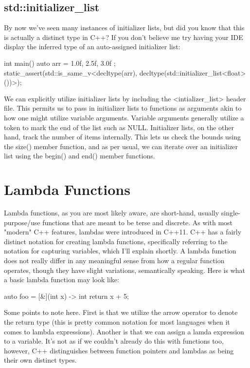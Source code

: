 \documentclass{article}
\begin{document}
\subsection{std::initializer\_list}

By now we've seen many instances of initializer lists, but did you know that this is actually a distinct type
in C++? If you don't believe me try having your IDE display the inferred type of an auto-assigned initializer
list:

\begin{cpplst}
    int main()
    {
        auto arr = { 1.0f, 2.5f, 3.0f };
        static_assert(std::is_same_v<decltype(arr), decltype(std::initializer_list<float>())>);
    }
\end{cpplst}

We can explicitly utilize initializer lists by including the <intializer\_list> header file. This permits us
to pass in initializer lists to functions as arguments akin to how one might utilize variable arguments.
Variable arguments generally utilize a token to mark the end of the list such as NULL. Initializer lists, on
the other hand, track the number of items internally. This lets us check the bounds using the size() member
function, and as per usual, we can iterate over an initializer list using the begin() and end() member
functions.

\section{Lambda Functions}

Lambda functions, as you are most likely aware, are short-hand, usually single-purpose/use functions that
are meant to be terse and discrete. As with most "modern" C++ features, lambdas were introduced in C++11.
C++ has a fairly distinct notation for creating lambda functions, specifically referring to the notation for
capturing variables, which I'll explain shortly. A lambda function does not really differ in any meaningful
sense from how a regular function operates, though they have slight variations, semantically speaking. Here
is what a basic lambda function may look like:

\begin{cpplst}
    auto foo = [&](int x) -> int
    {
        return x + 5;
    }
\end{cpplst}

Some points to note here. First is that we utilize the arrow operator to denote the return type (this is
pretty common notation for most languages when it comes to lambda expressions). Another is that we can assign
a lamda expression to a variable. It's not as if we couldn't already do this with functions too, however,
C++ distinguishes between function pointers and lambdas as being their own distinct types.
\end{document}

